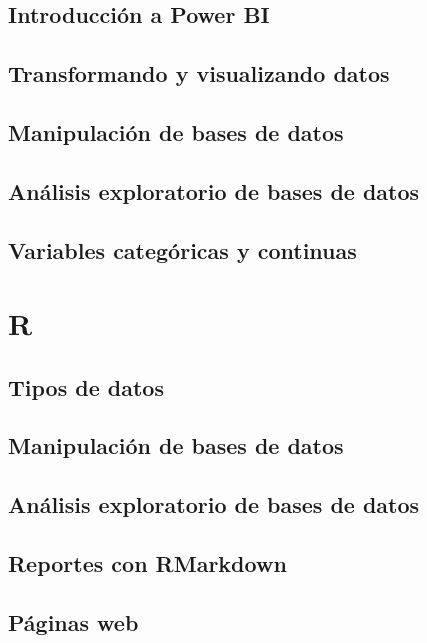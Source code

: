 \documentclass[
]{book}
\begin{document}
\hypertarget{introducciuxf3n-a-power-bi}{%
\section{Introducción a Power BI}\label{introducciuxf3n-a-power-bi}}

\hypertarget{transformando-y-visualizando-datos}{%
\section{Transformando y visualizando datos}\label{transformando-y-visualizando-datos}}

\hypertarget{manipulaciuxf3n-de-bases-de-datos-1}{%
\section{Manipulación de bases de datos}\label{manipulaciuxf3n-de-bases-de-datos-1}}

\hypertarget{anuxe1lisis-exploratorio-de-bases-de-datos-1}{%
\section{Análisis exploratorio de bases de datos}\label{anuxe1lisis-exploratorio-de-bases-de-datos-1}}

\hypertarget{variables-categuxf3ricas-y-continuas}{%
\section{Variables categóricas y continuas}\label{variables-categuxf3ricas-y-continuas}}

\hypertarget{r}{%
\chapter{R}\label{r}}

\hypertarget{tipos-de-datos-1}{%
\section{Tipos de datos}\label{tipos-de-datos-1}}

\hypertarget{manipulaciuxf3n-de-bases-de-datos-2}{%
\section{Manipulación de bases de datos}\label{manipulaciuxf3n-de-bases-de-datos-2}}

\hypertarget{anuxe1lisis-exploratorio-de-bases-de-datos-2}{%
\section{Análisis exploratorio de bases de datos}\label{anuxe1lisis-exploratorio-de-bases-de-datos-2}}

\hypertarget{reportes-con-rmarkdown}{%
\section{Reportes con RMarkdown}\label{reportes-con-rmarkdown}}

\hypertarget{puxe1ginas-web}{%
\section{Páginas web}\label{puxe1ginas-web}}

  
\end{document}

